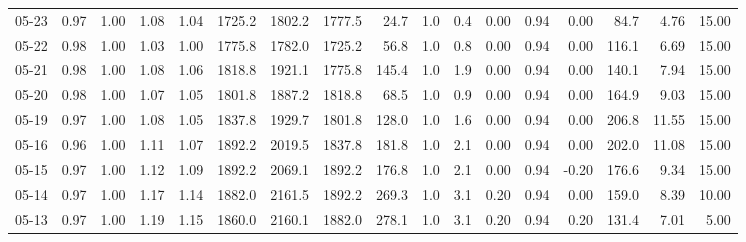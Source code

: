 \begin{threeparttable}
{\begin{tabular}{lrrrrrrrrrrrrrrrr}
  05-23 &         0.97 &           1.00 &          1.08 &          1.04 & 1725.2 & 1802.2 & 1777.5 &       24.7 &                      1.0 &                 0.4 &       0.00 &      0.94 &           0.00 &             84.7 &            4.76 &                  15.00 \\
  05-22 &         0.98 &           1.00 &          1.03 &          1.00 & 1775.8 & 1782.0 & 1725.2 &       56.8 &                      1.0 &                 0.8 &       0.00 &      0.94 &           0.00 &            116.1 &            6.69 &                  15.00 \\
  05-21 &         0.98 &           1.00 &          1.08 &          1.06 & 1818.8 & 1921.1 & 1775.8 &      145.4 &                      1.0 &                 1.9 &       0.00 &      0.94 &           0.00 &            140.1 &            7.94 &                  15.00 \\
  05-20 &         0.98 &           1.00 &          1.07 &          1.05 & 1801.8 & 1887.2 & 1818.8 &       68.5 &                      1.0 &                 0.9 &       0.00 &      0.94 &           0.00 &            164.9 &            9.03 &                  15.00 \\
  05-19 &         0.97 &           1.00 &          1.08 &          1.05 & 1837.8 & 1929.7 & 1801.8 &      128.0 &                      1.0 &                 1.6 &       0.00 &      0.94 &           0.00 &            206.8 &           11.55 &                  15.00 \\
  05-16 &         0.96 &           1.00 &          1.11 &          1.07 & 1892.2 & 2019.5 & 1837.8 &      181.8 &                      1.0 &                 2.1 &       0.00 &      0.94 &           0.00 &            202.0 &           11.08 &                  15.00 \\
  05-15 &         0.97 &           1.00 &          1.12 &          1.09 & 1892.2 & 2069.1 & 1892.2 &      176.8 &                      1.0 &                 2.1 &       0.00 &      0.94 &          -0.20 &            176.6 &            9.34 &                  15.00 \\
  05-14 &         0.97 &           1.00 &          1.17 &          1.14 & 1882.0 & 2161.5 & 1892.2 &      269.3 &                      1.0 &                 3.1 &       0.20 &      0.94 &           0.00 &            159.0 &            8.39 &                  10.00 \\
  05-13 &         0.97 &           1.00 &          1.19 &          1.15 & 1860.0 & 2160.1 & 1882.0 &      278.1 &                      1.0 &                 3.1 &       0.20 &      0.94 &           0.20 &            131.4 &            7.01 &                   5.00 \\

\end{tabular}}
\end{threeparttable}

